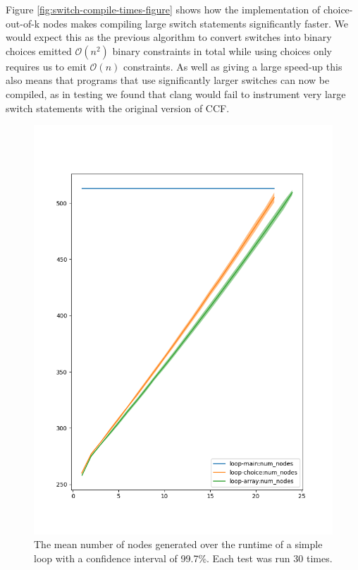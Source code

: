 \documentclass[12pt,twoside]{report}
\begin{document}
Figure \ref{fig:switch-compile-times-figure} shows how the implementation of choice-out-of-k nodes makes compiling large switch statements significantly faster. We would expect this as the previous algorithm to convert switches into binary choices emitted $\mathcal{O}(n^2)$ binary constraints in total while using choices only requires us to emit $\mathcal{O}(n)$ constraints. As well as giving a large speed-up this also means that programs that use significantly larger switches can now be compiled, as in testing we found that clang would fail to instrument very large switch statements with the original version of CCF. 


\begin{figure}
    \centering
    \includegraphics[scale=0.4]{loop-num-nodes.png}
    \caption{The mean number of nodes generated over the runtime of a simple loop with a confidence interval of 99.7\%. Each test was run 30 times.}
    \label{fig:loop-num-nodes}
\end{figure}
\end{document}
